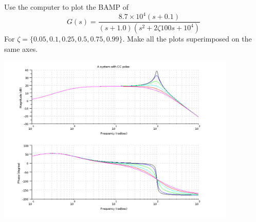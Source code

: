\begin{ExampleSmall}

Use the computer to plot the BAMP of
\[
G(s) =  \frac{8.7\times10^4(s+0.1)}    {(s+1.0)(s^2 + 2\zeta100s + 10^4)}
\]
For $\zeta = \{0.05, 0.1, 0.25, 0.5, 0.75, 0.99\}$.  Make all the plots superimposed on the same axes.


\includegraphics[width=4.5in]{figs05/zetasbodea.png}

\end{ExampleSmall}

